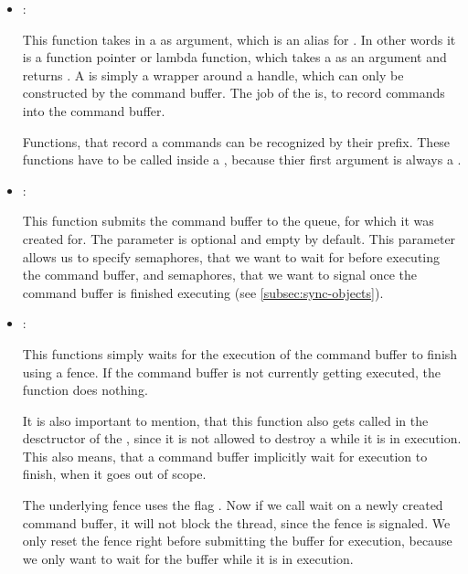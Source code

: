 \begin{itemize}
    \item \textbf{}:
    
    This function takes in a  as argument, which is an alias for \break {}. In other words it is a function pointer or lambda function, which takes a  as an argument and returns . A  is simply a wrapper around a  handle, which can only be constructed by the command buffer. The job of the  is, to record commands into the command buffer.

    Functions, that record a commands can be recognized by their  prefix. These functions have to be called inside a , because thier first argument is always a .

    \item \textbf{}:
    
    This function submits the command buffer to the queue, for which it was created for. The  parameter is optional and empty by default. This parameter allows us to specify semaphores, that we want to wait for before executing the command buffer, and semaphores, that we want to signal once the command buffer is finished executing (see \autoref{subsec:sync-objects}).

    \item \textbf{}:
    
    This functions simply waits for the execution of the command buffer to finish using a fence. If the command buffer is not currently getting executed, the function does nothing.

    It is also important to mention, that this function also gets called in the desctructor of the , since it is not allowed to destroy a  while it is in execution. This also means, that a command buffer implicitly wait for execution to finish, when it goes out of scope.
    
    The underlying fence uses the flag . Now if we call wait on a newly created command buffer, it will not block the thread, since the fence is signaled. We only reset the fence right before submitting the buffer for execution, because we only want to wait for the buffer while it is in execution.
\end{itemize}

